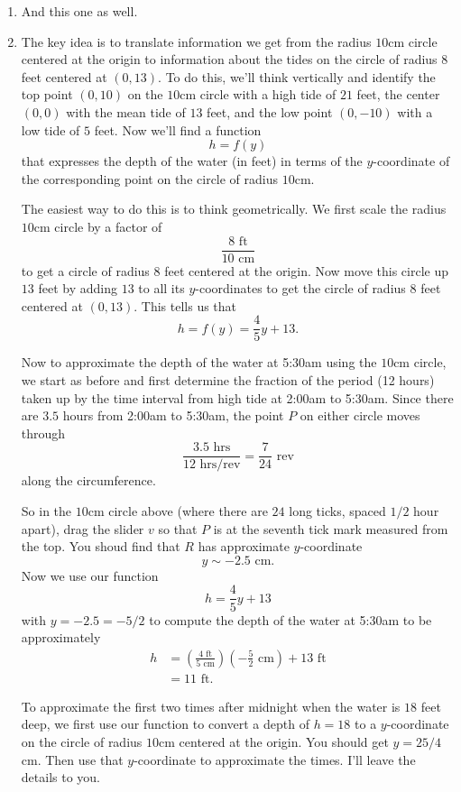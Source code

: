 \documentclass{ximera}
\begin{document}
\begin{example}
\begin{explanation}
\begin{enumerate}
\item And this one as well.

\item The key idea is to translate information we get from the radius $10$cm circle centered at the origin to information about the tides on the circle of radius $8$ feet centered at $(0,13)$. To do this, we'll think vertically and identify the top point $(0,10)$ on the $10$cm circle with a high tide of $21$ feet, the center $(0,0)$ with the mean tide of $13$ feet, and the low point $(0,-10)$ with a low tide of $5$ feet. Now we'll find a function
\[
 h = f(y)
\]
that expresses the depth of the water (in feet) in terms of the $y$-coordinate of the corresponding point on the circle of radius $10$cm.

The easiest way to do this is to think geometrically. We first scale the radius $10$cm circle by a factor of 
\[
   \frac{8\text{ ft}}{10\text{ cm}}
\]
to get a circle of radius $8$ feet centered at the origin. Now move this circle up $13$ feet by adding $13$ to all its $y$-coordinates to get the circle of radius $8$ feet centered at $(0,13)$. This tells us that
\[   
    h = f(y) = \frac{4}{5}y + 13.
\]

Now to approximate the depth of the water at 5:30am using the $10$cm circle, we start as before and first determine the fraction of the period (12 hours) taken up by the time interval from high tide at 2:00am to 5:30am. Since there are $3.5$ hours from 2:00am to 5:30am, the point $P$ on either circle moves through 
\[
  \frac{3.5\text{ hrs}}{12 \text{ hrs/rev}} = \frac{7}{24} \text{ rev}
\]
along the circumference.

So in the $10$cm circle above (where there are $24$ long ticks, spaced $1/2$ hour apart), drag the slider $v$ so that $P$ is at the seventh tick mark measured from the top. You shoud find that $R$ has approximate $y$-coordinate
\[
  y \sim -2.5 \text{ cm}.
\] 
Now we use our function 
\[
  h = \frac{4}{5}y + 13
\]
with $y=-2.5 = -5/2$ to compute the depth of the water at 5:30am to be approximately
\begin{align*}
 h  &= \left(\frac{4 \text{ ft}}{5\text{ cm}}\right)\left( -\frac{5}{2} \text{ cm}\right) + 13\text{ ft} \\
     &= 11 \text{ ft}.
\end{align*}

To approximate the first two times after midnight when the water is $18$ feet deep, we first use our function to convert a depth of $h=18$ to a $y$-coordinate on the circle of radius $10$cm centered at the origin. You should get $y=25/4$ cm. Then use that $y$-coordinate to approximate the times. I'll leave the details to you.

\end{enumerate}
\end{explanation}

\end{example}
\end{document}
